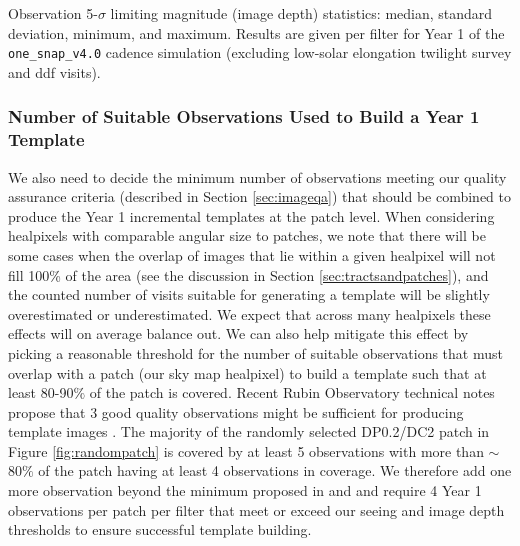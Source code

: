 \documentclass[preprintm,linenumbers]{aastex631}
\newcommand{\baseline}{\texttt{one\_snap\_v4.0}\xspace}
\begin{document}
	\begin{table}
		\centering
		
		\caption{
			Observation 5-$\sigma$ limiting magnitude (image depth) statistics: median, standard deviation, minimum, and maximum.
   Results are given per filter for Year 1 of the \baseline cadence simulation (excluding low-solar elongation twilight survey and \gls*{ddf} visits).
		}
		\label{tab:year1_image_depth}
	\end{table}
	
	\subsubsection{Number of Suitable Observations Used to Build a Year 1 Template}
	\label{sec:num_images}
	We also need to decide the minimum number of observations meeting our quality assurance criteria (described in Section \ref{sec:imageqa}) that should be combined to produce the Year 1 incremental templates at the patch level.  
 When considering healpixels with comparable angular size to patches, we note that there will be some cases when the overlap of images that lie within a given healpixel will not fill 100\% of the area (see the discussion in Section \ref{sec:tractsandpatches}), and the counted number of visits suitable for generating a template will be slightly overestimated or underestimated. 
 We expect that across many healpixels these effects will on average balance out. 
 We can also help mitigate this effect by picking a reasonable threshold for the number of suitable observations that must overlap with a patch (our sky map healpixel) to build a template such that at least 80-90$\%$ of the patch is covered. 
 Recent Rubin Observatory technical notes propose that 3 good quality observations might be sufficient for producing template images \citep{DMTN-107,RTN-011}. 
 The majority of the randomly selected DP0.2/DC2 patch in Figure \ref{fig:randompatch} is covered by at least 5 observations with more than $\sim$80$\%$ of the patch having at least 4 observations in coverage. 
 We therefore add one more observation beyond the minimum proposed in \cite{DMTN-107} and \cite{RTN-011} and require 4 Year 1 observations per patch per filter that meet or exceed our seeing and image depth thresholds to ensure successful template building.
		
\end{document}

